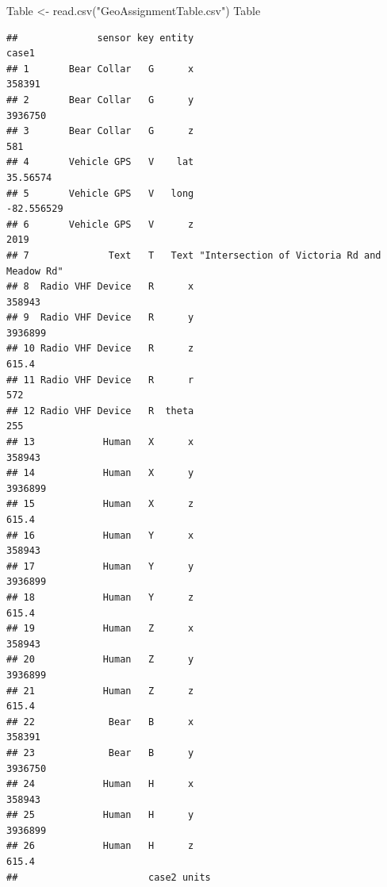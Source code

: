 \documentclass[
]{article}
\newenvironment{Shaded}{\begin{snugshade}}{\end{snugshade}}
\newcommand{\FunctionTok}[1]{\textcolor[rgb]{0.00,0.00,0.00}{#1}}
\newcommand{\NormalTok}[1]{#1}
\newcommand{\OtherTok}[1]{\textcolor[rgb]{0.56,0.35,0.01}{#1}}
\newcommand{\StringTok}[1]{\textcolor[rgb]{0.31,0.60,0.02}{#1}}
\begin{document}
\begin{Shaded}
\begin{Highlighting}[]
\NormalTok{Table }\OtherTok{\textless{}{-}} \FunctionTok{read.csv}\NormalTok{(}\StringTok{"GeoAssignmentTable.csv"}\NormalTok{) }
\NormalTok{Table}
\end{Highlighting}
\end{Shaded}

\begin{verbatim}
##              sensor key entity                                       case1
## 1       Bear Collar   G      x                                      358391
## 2       Bear Collar   G      y                                     3936750
## 3       Bear Collar   G      z                                         581
## 4       Vehicle GPS   V    lat                                    35.56574
## 5       Vehicle GPS   V   long                                  -82.556529
## 6       Vehicle GPS   V      z                                        2019
## 7              Text   T   Text "Intersection of Victoria Rd and Meadow Rd"
## 8  Radio VHF Device   R      x                                      358943
## 9  Radio VHF Device   R      y                                     3936899
## 10 Radio VHF Device   R      z                                       615.4
## 11 Radio VHF Device   R      r                                         572
## 12 Radio VHF Device   R  theta                                         255
## 13            Human   X      x                                      358943
## 14            Human   X      y                                     3936899
## 15            Human   X      z                                       615.4
## 16            Human   Y      x                                      358943
## 17            Human   Y      y                                     3936899
## 18            Human   Y      z                                       615.4
## 19            Human   Z      x                                      358943
## 20            Human   Z      y                                     3936899
## 21            Human   Z      z                                       615.4
## 22             Bear   B      x                                      358391
## 23             Bear   B      y                                     3936750
## 24            Human   H      x                                      358943
## 25            Human   H      y                                     3936899
## 26            Human   H      z                                       615.4
##                       case2 units

\end{verbatim}
\end{document}
